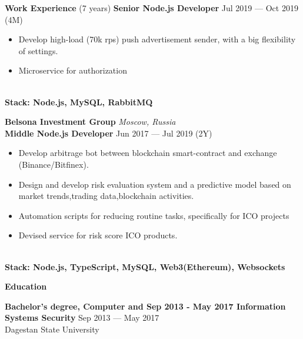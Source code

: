 \documentclass{resume} %
\begin{document}
\begin{rSection}{\textbf{Work Experience} (7 years) }
\textbf{Senior Node.js Developer} \hfill Jul 2019 --- Oct 2019 (4M)
\begin{itemize}
    \setlength\itemsep{-0.4em}
    \item Develop high-load (70k rps) push advertisement sender, with a big flexibility of settings.
    \item Microservice for authorization
\end{itemize}
\\\textbf{Stack: Node.js, MySQL, RabbitMQ}

\textbf{Belsona Investment Group} \hfill \textit{Moscow, Russia} \\
\textbf{Middle Node.js Developer}  \hfill Jun 2017 --- Jul 2019 (2Y)

\begin{itemize}
    \setlength\itemsep{-0.4em}
    \item Develop arbitrage bot between blockchain smart-contract and exchange (Binance/Bitfinex).
    \item Design and develop risk evaluation system and a predictive model based on market trends,trading data,blockchain activities.
    \item Automation scripts for reducing routine tasks, specifically for ICO projects
    \item Devised service for risk score ICO products.
\end{itemize}
\\\textbf{Stack: Node.js, TypeScript, MySQL, Web3(Ethereum), Websockets}

\end{rSection}



\begin{rSection}{\textbf{Education}}

\textbf{Bachelor's degree, Computer and Sep 2013 - May 2017 Information Systems Security} \hfill {Sep 2013 --- May 2017} \\
	  Dagestan State University

\end{rSection}
\end{document}

